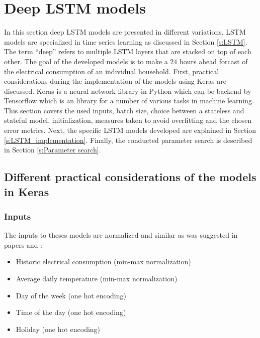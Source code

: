 \section{Deep LSTM models}\label{s:Neural network models}
In this section deep LSTM models are presented in different variations. LSTM models are specialized in time series learning as discussed in Section \ref{s:LSTM}. The term ``deep'' refers to multiple LSTM layers that are stacked on top of each other. The goal of the developed models is to make a $ 24 $ hours ahead forcast of the electrical consumption of an individual household. First, practical considerations during the implementation of the models using Keras are discussed. Keras is a neural network library in Python which can be backend by Tensorflow which is an library for a number of various tasks in machine learning. This section covers the used inputs, batch size, choice between a stateless and stateful model, initialization, measures taken to avoid overfitting and the chosen error metrics. Next, the specific LSTM models developed are explained in Section \ref{s:LSTM_implementation}. Finally, the conducted parameter search is described in Section \ref{s:Parameter search}.

\subsection{Different practical considerations of the models in Keras}

\subsubsection{Inputs}\label{s:Inputs}
The inputs to theses models are normalized and similar as was suggested in papers \cite{loadforecastingmoor} and \cite{Kong2019}: 

\begin{itemize}
	\item Historic electrical consumption (min-max normalization)
	\item Average daily temperature (min-max normalization)
	\item Day of the week (one hot encoding)
	\item Time of the day (one hot encoding)
	\item Holiday (one hot encoding)
\end{itemize}

